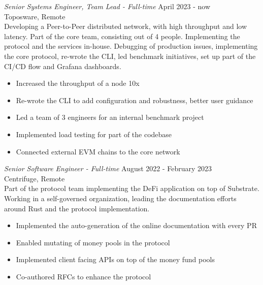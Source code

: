 \documentclass[10pt]{res} %
\begin{document}
\begin{resume}
{\sl Senior Systems Engineer, Team Lead - Full-time} \hfill April 2023 - now \\
Toposware, Remote \\
Developing a Peer-to-Peer distributed network, with high throughput and low latency. Part of the core team, consisting out of 4 people. Implementing the protocol and the services in-house. Debugging of production issues, implementing the core protocol, re-wrote the CLI, led benchmark initiatives, set up part of the CI/CD flow and Grafana dashboards.
\begin{itemize} \itemsep -2pt %
\item Increased the throughput of a node 10x 
\item Re-wrote the CLI to add configuration and robustness, better user guidance
\item Led a team of 3 engineers for an internal benchmark project
\item Implemented load testing for part of the codebase 
\item Connected external EVM chains to the core network
\end{itemize}

{\sl Senior Software Engineer - Full-time} \hfill August 2022 - February 2023 \\
Centrifuge, Remote \\
Part of the protocol team implementing the DeFi application on top of Substrate. Working in a self-governed organization, leading the documentation efforts around Rust and the protocol implementation.
\begin{itemize} \itemsep -2pt %
\item Implemented the auto-generation of the online documentation with every PR
\item Enabled mutating of money pools in the protocol
\item Implemented client facing APIs on top of the money fund pools
\item Co-authored RFCs to enhance the protocol 
\end{itemize}


\end{resume}
\end{document}
